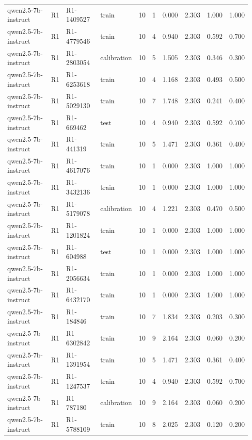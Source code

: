\begin{table}
\begin{tabular}{llllrrrrrr}
qwen2.5-7b-instruct & R1 & R1-1409527 & train & 10 & 1 & 0.000 & 2.303 & 1.000 & 1.000 \\
qwen2.5-7b-instruct & R1 & R1-4779546 & train & 10 & 4 & 0.940 & 2.303 & 0.592 & 0.700 \\
qwen2.5-7b-instruct & R1 & R1-2803054 & calibration & 10 & 5 & 1.505 & 2.303 & 0.346 & 0.300 \\
qwen2.5-7b-instruct & R1 & R1-6253618 & train & 10 & 4 & 1.168 & 2.303 & 0.493 & 0.500 \\
qwen2.5-7b-instruct & R1 & R1-5029130 & train & 10 & 7 & 1.748 & 2.303 & 0.241 & 0.400 \\
qwen2.5-7b-instruct & R1 & R1-669462 & test & 10 & 4 & 0.940 & 2.303 & 0.592 & 0.700 \\
qwen2.5-7b-instruct & R1 & R1-441319 & train & 10 & 5 & 1.471 & 2.303 & 0.361 & 0.400 \\
qwen2.5-7b-instruct & R1 & R1-4617076 & train & 10 & 1 & 0.000 & 2.303 & 1.000 & 1.000 \\
qwen2.5-7b-instruct & R1 & R1-3432136 & train & 10 & 1 & 0.000 & 2.303 & 1.000 & 1.000 \\
qwen2.5-7b-instruct & R1 & R1-5179078 & calibration & 10 & 4 & 1.221 & 2.303 & 0.470 & 0.500 \\
qwen2.5-7b-instruct & R1 & R1-1201824 & train & 10 & 1 & 0.000 & 2.303 & 1.000 & 1.000 \\
qwen2.5-7b-instruct & R1 & R1-604988 & test & 10 & 1 & 0.000 & 2.303 & 1.000 & 1.000 \\
qwen2.5-7b-instruct & R1 & R1-2056634 & train & 10 & 1 & 0.000 & 2.303 & 1.000 & 1.000 \\
qwen2.5-7b-instruct & R1 & R1-6432170 & train & 10 & 1 & 0.000 & 2.303 & 1.000 & 1.000 \\
qwen2.5-7b-instruct & R1 & R1-184846 & train & 10 & 7 & 1.834 & 2.303 & 0.203 & 0.300 \\
qwen2.5-7b-instruct & R1 & R1-6302842 & train & 10 & 9 & 2.164 & 2.303 & 0.060 & 0.200 \\
qwen2.5-7b-instruct & R1 & R1-1391954 & train & 10 & 5 & 1.471 & 2.303 & 0.361 & 0.400 \\
qwen2.5-7b-instruct & R1 & R1-1247537 & train & 10 & 4 & 0.940 & 2.303 & 0.592 & 0.700 \\
qwen2.5-7b-instruct & R1 & R1-787180 & calibration & 10 & 9 & 2.164 & 2.303 & 0.060 & 0.200 \\
qwen2.5-7b-instruct & R1 & R1-5788109 & train & 10 & 8 & 2.025 & 2.303 & 0.120 & 0.200 \\

\end{tabular}
\end{table}
